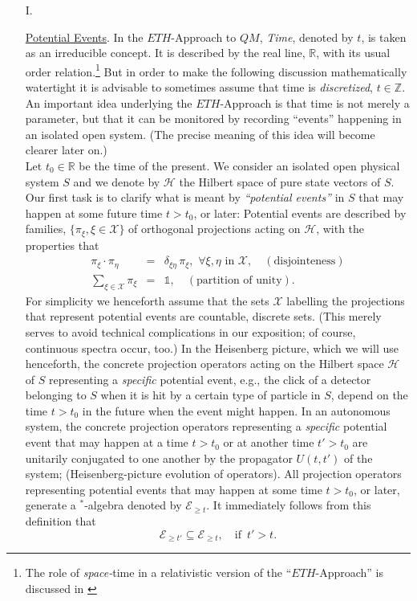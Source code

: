 \documentclass[a4paper,11pt]{article}
\begin{document}
\begin{enumerate}
\item[I.]{\underline{Potential Events}. In the $ETH$-Approach to $QM$, \textit{Time}, denoted by $t$, is taken as an irreducible concept. It is described by the real line, $\mathbb{R}$, with its usual order relation.\footnote{The role of \textit{space-}time in a relativistic version of the ``$ETH$-Approach'' is discussed in \cite{Fr}} But in order to make the following discussion mathematically watertight it is advisable to sometimes assume that time is \textit{discretized}, $t \in \mathbb{Z}$. An important idea underlying the $ETH$-Approach is that time is not merely a parameter, but that it can be monitored by recording ``events'' happening in an isolated open system. (The precise meaning of this idea will become clearer later on.)
\\Let $t_0 \in \mathbb{R}$ be the time of the present. We consider an isolated open physical system $S$ and we denote by $\mathcal{H}$ the Hilbert space of pure state vectors of $S$. Our first task is to clarify what is meant by \textit{``potential events''} in $S$ that may happen at some future time $t>t_0$, or later: Potential events are described by families, $\lbrace \pi_{\xi}, \xi \in \mathcal{X} \rbrace$ of orthogonal projections acting on $\mathcal{H}$, with the properties that 
\begin{eqnarray}\label{pot-event}
\pi_{\xi}\cdot \pi_{\eta} &=& \delta_{\xi \eta}\, \pi_{\xi}, \,\,\forall \xi, \eta \,\,\text{in} \,\,\mathcal{X}, \quad(\text{disjointeness}) \nonumber\\
\sum_{\xi \in \mathcal{X}} \pi_{\xi}& =& {\mathds{1}}, \quad(\text{partition of unity}).
\end{eqnarray}
For simplicity we henceforth assume that the sets $\mathcal{X}$ labelling the projections that represent potential events are countable, discrete sets. (This merely serves to avoid technical complications in our exposition; of course, continuous spectra occur, too.)
In the Heisenberg picture, which we will use henceforth, the concrete projection operators acting on the Hilbert space 
$\mathcal{H}$ of $S$ representing a \textit{specific} potential event, e.g., the click of a detector belonging to $S$ when it is hit by a certain type of particle in $S$, depend on the time $t>t_{0}$ in the future when the event might happen. In an autonomous system, the concrete projection operators representing a \textit{specific} potential event that may happen at a time $t>t_0$ or at another time $t'>t_0$ are unitarily conjugated to one another by the propagator $U(t,t')$ of the system; (Heisenberg-picture evolution of operators). All projection operators representing potential events that may happen at some time $t>t_0$, or later, generate a $^{*}$-algebra denoted by $\mathcal{E}_{\geq t}$. It immediately follows from this definition that 
$$\mathcal{E}_{\geq t'} \subseteq \mathcal{E}_{\geq t}, \quad \text{if   }\, t'>t.$$

}
\end{enumerate}
\end{document}
